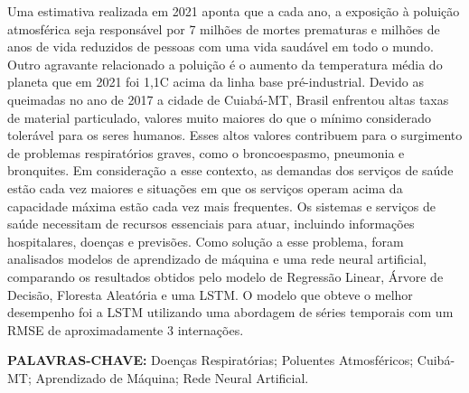\documentclass[
  12pt,		%
  a4paper,	%
  openright,%
  oneside,	%
  chapter=TITLE,		%
  section=TITLE,		%
  english,	%
  french,	%
  spanish,	%
  brazil	%
]{abntex2}
\begin{document}
    \begin{resumo}
    
    Uma estimativa realizada em 2021 aponta que a cada ano, a exposição à poluição atmosférica seja 
    responsável por 7 milhões de mortes prematuras e milhões de anos de vida reduzidos de pessoas 
    com uma vida saudável em todo o mundo. Outro agravante relacionado a poluição é o aumento da
    temperatura média do planeta que em 2021 foi 1,1\degree C acima da linha base pré-industrial.
    Devido as queimadas no ano de 2017 a cidade de Cuiabá-MT, Brasil enfrentou altas taxas de material particulado, valores
    muito maiores do que o mínimo considerado tolerável para os seres humanos. Esses altos valores
    contribuem para o surgimento de problemas respiratórios graves, como o
    broncoespasmo, pneumonia e bronquites.
    Em consideração a esse contexto, as demandas dos serviços de saúde estão cada vez maiores e situações em que os 
    serviços operam acima da capacidade máxima estão cada vez mais frequentes. Os sistemas e serviços de saúde necessitam 
    de recursos essenciais para atuar, incluindo informações hospitalares, doenças e previsões.
    Como solução a esse problema, foram analisados modelos de aprendizado de máquina e uma rede neural artificial, comparando
    os resultados obtidos pelo modelo de Regressão Linear, Árvore de Decisão, Floresta Aleatória e uma LSTM.
    O modelo que obteve o melhor desempenho foi a LSTM utilizando uma abordagem de séries temporais com um RMSE de aproximadamente
    3 internações.
        
        \vspace*{0.5cm}
    
        \noindent\textbf{\MakeUppercase{Palavras-Chave: }} Doenças Respiratórias; Poluentes Atmosféricos; Cuibá-MT;
        Aprendizado de Máquina; Rede Neural Artificial.
         
    
    \end{resumo}
    
    
\end{document}
